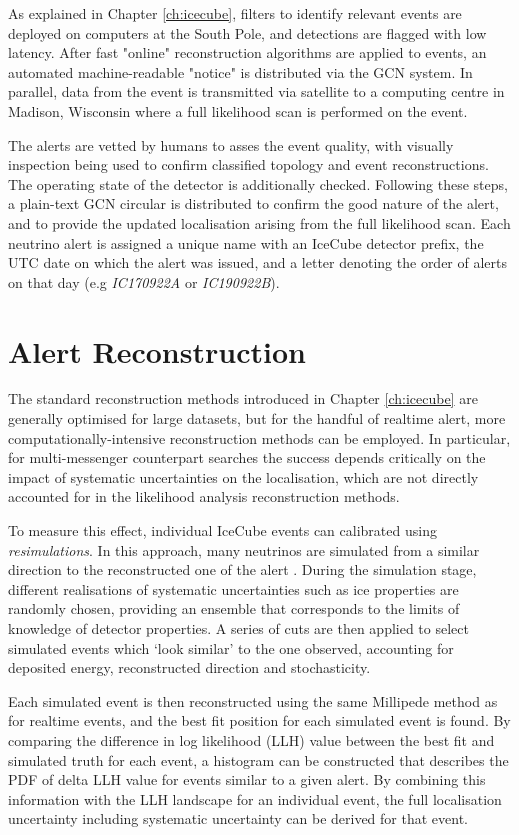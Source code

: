 As explained in Chapter \ref{ch:icecube}, filters to identify relevant events are deployed on computers at the South Pole, and detections are flagged with low latency. After fast "online" reconstruction algorithms are applied to events, an automated machine-readable "notice" is distributed via the GCN system. In parallel, data from the event is transmitted via satellite to a computing centre in Madison, Wisconsin where a full likelihood scan is performed on the event.

The alerts are vetted by humans to asses the event quality, with visually inspection being used to confirm classified topology and event reconstructions. The operating state of the detector is additionally checked. Following these steps, a plain-text GCN circular is distributed to confirm the good nature of the alert, and to provide the updated localisation arising from the full likelihood scan. Each neutrino alert is assigned a unique name with an IceCube detector prefix, the UTC date on which the alert was issued, and a letter denoting the order of alerts on that day (e.g \emph{IC170922A} or \emph{IC190922B}).

\section{Alert Reconstruction}
\label{sec:alert_reco}
The standard reconstruction methods introduced in Chapter \ref{ch:icecube} are generally optimised for large datasets, but for the handful of realtime alert, more computationally-intensive reconstruction methods can be employed. In particular, for multi-messenger counterpart searches the success depends critically on the impact of systematic uncertainties on the localisation, which are not directly accounted for in the likelihood analysis reconstruction methods.

To measure this effect, individual IceCube events can calibrated using \emph{resimulations}. In this approach, many neutrinos are simulated from a similar direction to the reconstructed one of the alert . During the simulation stage, different realisations of systematic uncertainties such as ice properties are randomly chosen, providing an ensemble that corresponds to the limits of knowledge of detector properties. A series of cuts are then applied to select simulated events which `look similar' to the one observed, accounting for deposited energy, reconstructed direction and stochasticity. 

Each simulated event is then reconstructed using the same Millipede method as for realtime events, and the best fit position for each simulated event is found. By comparing the difference in log likelihood (LLH) value between the best fit and simulated truth for each event, a histogram can be constructed that describes the PDF of delta LLH value for events similar to a given alert. By combining this information with the LLH landscape for an individual event, the full localisation uncertainty including systematic uncertainty can be derived for that event. 

